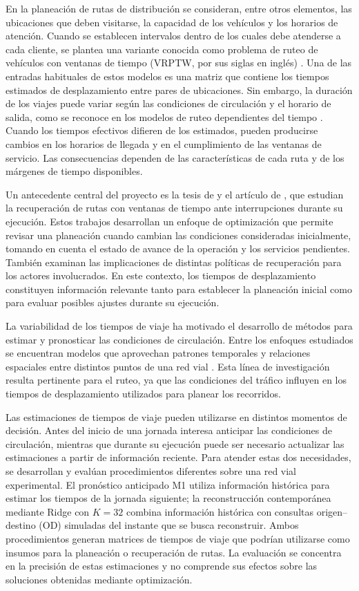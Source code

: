 \documentclass[letterpaper,11pt]{article}
\begin{document}
En la planeación de rutas de distribución se consideran, entre otros elementos, las ubicaciones que deben visitarse, la capacidad de los vehículos y los horarios de atención. Cuando se establecen intervalos dentro de los cuales debe atenderse a cada cliente, se plantea una variante conocida como problema de ruteo de vehículos con ventanas de tiempo (VRPTW, por sus siglas en inglés) \parencite{solomon1987}. Una de las entradas habituales de estos modelos es una matriz que contiene los tiempos estimados de desplazamiento entre pares de ubicaciones. Sin embargo, la duración de los viajes puede variar según las condiciones de circulación y el horario de salida, como se reconoce en los modelos de ruteo dependientes del tiempo \parencite{malandraki1992,ichoua2003}. Cuando los tiempos efectivos difieren de los estimados, pueden producirse cambios en los horarios de llegada y en el cumplimiento de las ventanas de servicio. Las consecuencias dependen de las características de cada ruta y de los márgenes de tiempo disponibles.

Un antecedente central del proyecto es la tesis de \textcite{berth2025} y el artículo de \textcite{berthtrigos2025}, que estudian la recuperación de rutas con ventanas de tiempo ante interrupciones durante su ejecución. Estos trabajos desarrollan un enfoque de optimización que permite revisar una planeación cuando cambian las condiciones consideradas inicialmente, tomando en cuenta el estado de avance de la operación y los servicios pendientes. También examinan las implicaciones de distintas políticas de recuperación para los actores involucrados. En este contexto, los tiempos de desplazamiento constituyen información relevante tanto para establecer la planeación inicial como para evaluar posibles ajustes durante su ejecución.

La variabilidad de los tiempos de viaje ha motivado el desarrollo de métodos para estimar y pronosticar las condiciones de circulación. Entre los enfoques estudiados se encuentran modelos que aprovechan patrones temporales y relaciones espaciales entre distintos puntos de una red vial \parencite{li2018,wu2019}. Esta línea de investigación resulta pertinente para el ruteo, ya que las condiciones del tráfico influyen en los tiempos de desplazamiento utilizados para planear los recorridos.

Las estimaciones de tiempos de viaje pueden utilizarse en distintos momentos de decisión. Antes del inicio de una jornada interesa anticipar las condiciones de circulación, mientras que durante su ejecución puede ser necesario actualizar las estimaciones a partir de información reciente. Para atender estas dos necesidades, se desarrollan y evalúan procedimientos diferentes sobre una red vial experimental. El pronóstico anticipado M1 utiliza información histórica para estimar los tiempos de la jornada siguiente; la reconstrucción contemporánea mediante Ridge con $K=32$ combina información histórica con consultas origen--destino (OD) simuladas del instante que se busca reconstruir. Ambos procedimientos generan matrices de tiempos de viaje que podrían utilizarse como insumos para la planeación o recuperación de rutas. La evaluación se concentra en la precisión de estas estimaciones y no comprende sus efectos sobre las soluciones obtenidas mediante optimización.
\end{document}
